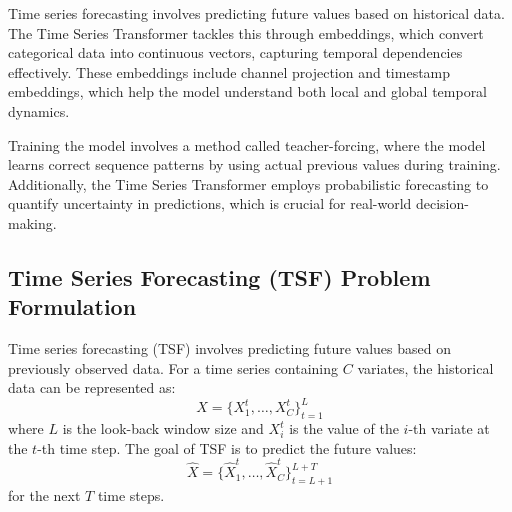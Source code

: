 Time series forecasting involves predicting future values based on historical data. The Time Series Transformer tackles this through embeddings, which convert categorical data into continuous vectors, capturing temporal dependencies effectively. These embeddings include channel projection and timestamp embeddings, which help the model understand both local and global temporal dynamics.

Training the model involves a method called teacher-forcing, where the model learns correct sequence patterns by using actual previous values during training. Additionally, the Time Series Transformer employs probabilistic forecasting to quantify uncertainty in predictions, which is crucial for real-world decision-making.

\subsection{Time Series Forecasting (TSF) Problem Formulation}
Time series forecasting (TSF) involves predicting future values based on previously observed data. For a time series containing \(C\) variates, the historical data can be represented as:
\[
X = \{X^t_1, \ldots, X^t_C\}_{t=1}^L
\]
where \(L\) is the look-back window size and \(X^t_i\) is the value of the \(i\)-th variate at the \(t\)-th time step. The goal of TSF is to predict the future values:
\[
\hat{X} = \{\hat{X}^t_1, \ldots, \hat{X}^t_C\}_{t=L+1}^{L+T}
\]
for the next \(T\) time steps.

